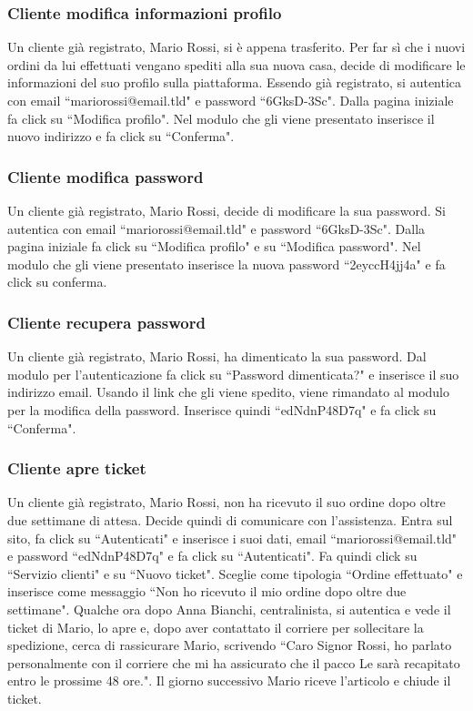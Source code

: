 \documentclass[12pt]{article}
\begin{document}
\newpage

\subsubsection{Cliente modifica informazioni profilo}
Un cliente già registrato, Mario Rossi, si è appena trasferito. Per far sì che i nuovi ordini da lui effettuati vengano spediti alla sua nuova casa, decide di modificare le informazioni del suo profilo sulla piattaforma.
Essendo già registrato, si autentica con email ``mariorossi@email.tld" e password ``6GksD-3Sc".
Dalla pagina iniziale fa click su ``Modifica profilo".
Nel modulo che gli viene presentato inserisce il nuovo indirizzo e fa click su ``Conferma".

\subsubsection{Cliente modifica password}
Un cliente già registrato, Mario Rossi, decide di modificare la sua password. 
Si autentica con email ``mariorossi@email.tld" e password ``6GksD-3Sc".
Dalla pagina iniziale fa click su ``Modifica profilo" e su ``Modifica password".
Nel modulo che gli viene presentato inserisce la nuova password ``2eyccH4jj4a" e fa click su conferma.

\subsubsection{Cliente recupera password}
Un cliente già registrato, Mario Rossi, ha dimenticato la sua password.
Dal modulo per l'autenticazione fa click su ``Password dimenticata?" e inserisce il suo indirizzo email.
Usando il link che gli viene spedito, viene rimandato al modulo per la modifica della password. Inserisce quindi ``edNdnP48D7q" e fa click su ``Conferma".

\subsubsection{Cliente apre ticket}
Un cliente già registrato, Mario Rossi, non ha ricevuto il suo ordine dopo oltre due settimane di attesa. Decide quindi di comunicare con l'assistenza.
Entra sul sito, fa click su ``Autenticati" e inserisce i suoi dati, email ``mariorossi@email.tld" e password ``edNdnP48D7q" e fa click su ``Autenticati".
Fa quindi click su ``Servizio clienti" e su ``Nuovo ticket".
Sceglie come tipologia ``Ordine effettuato" e inserisce come messaggio ``Non ho ricevuto il mio ordine dopo oltre due settimane".
Qualche ora dopo Anna Bianchi, centralinista, si autentica e vede il ticket di Mario, lo apre e, dopo aver contattato il corriere per sollecitare la spedizione, cerca di rassicurare Mario, scrivendo ``Caro Signor Rossi, ho parlato personalmente con il corriere che mi ha assicurato che il pacco Le sarà recapitato entro le prossime 48 ore.".
Il giorno successivo Mario riceve l'articolo e chiude il ticket.
\end{document}
